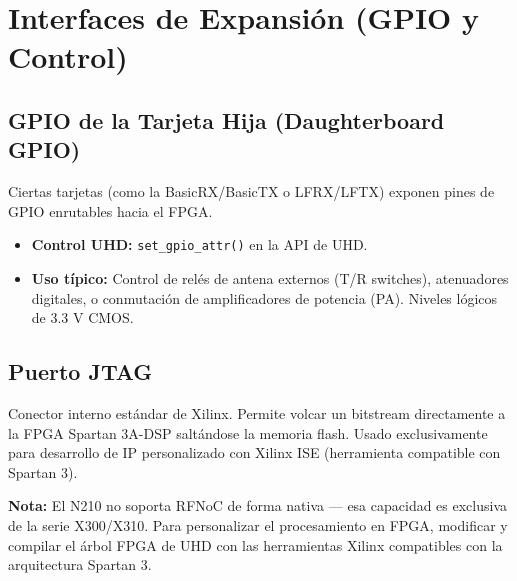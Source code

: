 \documentclass[11pt]{article}
\begin{document}
\section{Interfaces de Expansión (GPIO y Control)}

\subsection*{GPIO de la Tarjeta Hija (Daughterboard GPIO)}
Ciertas tarjetas (como la BasicRX/BasicTX o LFRX/LFTX) exponen pines de GPIO enrutables hacia el FPGA.
\begin{itemize}
    \item \textbf{Control UHD:} \texttt{set\_gpio\_attr()} en la API de UHD.
    \item \textbf{Uso típico:} Control de relés de antena externos (T/R switches), atenuadores digitales, o conmutación de amplificadores de potencia (PA). Niveles lógicos de 3.3 V CMOS.
\end{itemize}

\subsection*{Puerto JTAG}
Conector interno estándar de Xilinx. Permite volcar un bitstream directamente a la FPGA Spartan 3A-DSP saltándose la memoria flash. Usado exclusivamente para desarrollo de IP personalizado con Xilinx ISE (herramienta compatible con Spartan 3).

\textbf{Nota:} El N210 no soporta RFNoC de forma nativa — esa capacidad es exclusiva de la serie X300/X310. Para personalizar el procesamiento en FPGA, modificar y compilar el árbol FPGA de UHD con las herramientas Xilinx compatibles con la arquitectura Spartan 3.
\end{document}
